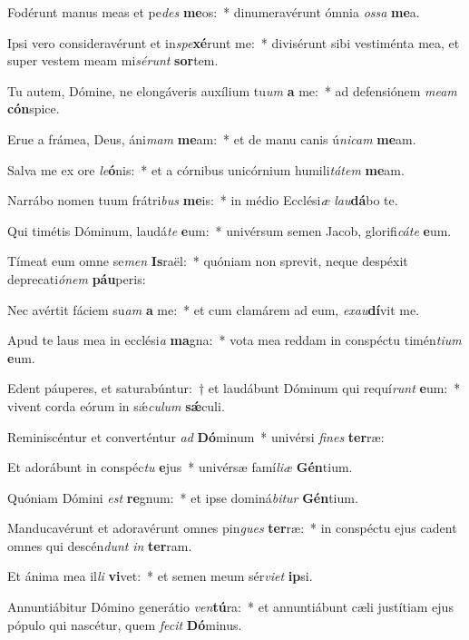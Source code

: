 \item Fodérunt manus meas et pe\textit{des} \textbf{me}os:~* dinumeravérunt ómnia \textit{os}\textit{sa} \textbf{me}a.
\item Ipsi vero consideravérunt et in\textit{spe}\textbf{xé}runt me:~* divisérunt sibi vestiménta mea, et super vestem meam mi\textit{sé}\textit{runt} \textbf{sor}tem.
\item Tu autem, Dómine, ne elongáveris auxílium tu\textit{um} \textbf{a} me:~* ad defensiónem \textit{me}\textit{am} \textbf{cón}spice.
\item Erue a frámea, Deus, áni\textit{mam} \textbf{me}am:~* et de manu canis ú\textit{ni}\textit{cam} \textbf{me}am.
\item Salva me ex ore \textit{le}\textbf{ó}nis:~* et a córnibus unicórnium humili\textit{tá}\textit{tem} \textbf{me}am.
\item Narrábo nomen tuum frátri\textit{bus} \textbf{me}is:~* in médio Ecclési\textit{æ} \textit{lau}\textbf{dá}bo te.
\item Qui timétis Dóminum, laudá\textit{te} \textbf{e}um:~* univérsum semen Jacob, glorifi\textit{cá}\textit{te} \textbf{e}um.
\item Tímeat eum omne se\textit{men} \textbf{Is}raël:~* quóniam non sprevit, neque despéxit deprecati\textit{ó}\textit{nem} \textbf{páu}peris:
\item Nec avértit fáciem su\textit{am} \textbf{a} me:~* et cum clamárem ad eum, \textit{ex}\textit{au}\textbf{dí}vit me.
\item Apud te laus mea in ecclési\textit{a} \textbf{ma}gna:~* vota mea reddam in conspéctu timén\textit{ti}\textit{um} \textbf{e}um.
\item Edent páuperes, et saturabúntur:~† et laudábunt Dóminum qui requí\textit{runt} \textbf{e}um:~* vivent corda eórum in sǽ\textit{cu}\textit{lum} \textbf{sǽ}culi.
\item Reminiscéntur et converténtur \textit{ad} \textbf{Dó}minum~* univérsi \textit{fi}\textit{nes} \textbf{ter}ræ:
\item Et adorábunt in conspéc\textit{tu} \textbf{e}jus~* univérsæ famí\textit{li}\textit{æ} \textbf{Gén}tium.
\item Quóniam Dómini \textit{est} \textbf{re}gnum:~* et ipse dominá\textit{bi}\textit{tur} \textbf{Gén}tium.
\item Manducavérunt et adoravérunt omnes pin\textit{gues} \textbf{ter}ræ:~* in conspéctu ejus cadent omnes qui descén\textit{dunt} \textit{in} \textbf{ter}ram.
\item Et ánima mea il\textit{li} \textbf{vi}vet:~* et semen meum sér\textit{vi}\textit{et} \textbf{ip}si.
\item Annuntiábitur Dómino generátio \textit{ven}\textbf{tú}ra:~* et annuntiábunt cæli justítiam ejus pópulo qui nascétur, quem \textit{fe}\textit{cit} \textbf{Dó}minus.
